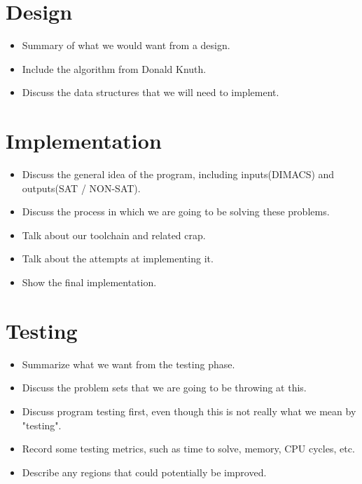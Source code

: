 \documentclass{article}
\begin{document}
\section{Design}
\begin{itemize}
    \item Summary of what we would want from a design.
    \item Include the algorithm from Donald Knuth.
    \item Discuss the data structures that we will need to implement.
\end{itemize}

\section{Implementation}
\begin{itemize}
    \item Discuss the general idea of the program, including inputs(DIMACS) and outputs(SAT / NON-SAT).
    \item Discuss the process in which we are going to be solving these problems.
    \item Talk about our toolchain and related crap.
    \item Talk about the attempts at implementing it.
    \item Show the final implementation.
\end{itemize}

\section{Testing}
\begin{itemize}
    \item Summarize what we want from the testing phase.
    \item Discuss the problem sets that we are going to be throwing at this.
    \item Discuss program testing first, even though this is not really what we mean by "testing".
    \item Record some testing metrics, such as time to solve, memory, CPU cycles, etc.
    \item Describe any regions that could potentially be improved.
\end{itemize}
\end{document}
